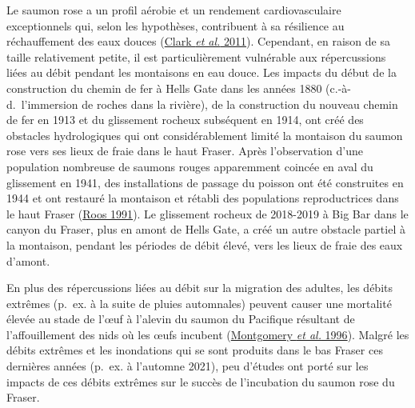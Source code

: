 \documentclass[french,11pt]{book}
\begin{document}
Le saumon rose a un profil aérobie et un rendement cardiovasculaire exceptionnels qui, selon les hypothèses, contribuent à sa résilience au réchauffement des eaux douces (\protect\hyperlink{ref-clarkExceptionalAerobicScope2011}{Clark \emph{et al.} 2011}). Cependant, en raison de sa taille relativement petite, il est particulièrement vulnérable aux répercussions liées au débit pendant les montaisons en eau douce. Les impacts du début de la construction du chemin de fer à Hells Gate dans les années 1880 (c.-à-d.~l'immersion de roches dans la rivière), de la construction du nouveau chemin de fer en 1913 et du glissement rocheux subséquent en 1914, ont créé des obstacles hydrologiques qui ont considérablement limité la montaison du saumon rose vers ses lieux de fraie dans le haut Fraser. Après l'observation d'une population nombreuse de saumons rouges apparemment coincée en aval du glissement en 1941, des installations de passage du poisson ont été construites en 1944 et ont restauré la montaison et rétabli des populations reproductrices dans le haut Fraser (\protect\hyperlink{ref-roosRestoringFraserRiver1991}{Roos 1991}). Le glissement rocheux de 2018-2019 à Big Bar dans le canyon du Fraser, plus en amont de Hells Gate, a créé un autre obstacle partiel à la montaison, pendant les périodes de débit élevé, vers les lieux de fraie des eaux d'amont.

En plus des répercussions liées au débit sur la migration des adultes, les débits extrêmes (p.~ex. à la suite de pluies automnales) peuvent causer une mortalité élevée au stade de l'œuf à l'alevin du saumon du Pacifique résultant de l'affouillement des nids où les œufs incubent (\protect\hyperlink{ref-montgomeryStreambedScourEgg1996}{Montgomery \emph{et al.} 1996}). Malgré les débits extrêmes et les inondations qui se sont produits dans le bas Fraser ces dernières années (p.~ex. à l'automne 2021), peu d'études ont porté sur les impacts de ces débits extrêmes sur le succès de l'incubation du saumon rose du Fraser.
\end{document}
